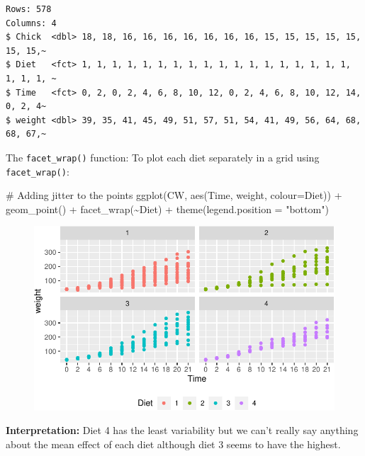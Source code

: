 \documentclass[
  letterpaper,
  DIV=11,
  numbers=noendperiod]{scrreprt}
\newenvironment{Shaded}{\begin{snugshade}}{\end{snugshade}}
\newcommand{\AttributeTok}[1]{\textcolor[rgb]{0.40,0.45,0.13}{#1}}
\newcommand{\CommentTok}[1]{\textcolor[rgb]{0.37,0.37,0.37}{#1}}
\newcommand{\FunctionTok}[1]{\textcolor[rgb]{0.28,0.35,0.67}{#1}}
\newcommand{\NormalTok}[1]{\textcolor[rgb]{0.00,0.23,0.31}{#1}}
\newcommand{\SpecialCharTok}[1]{\textcolor[rgb]{0.37,0.37,0.37}{#1}}
\newcommand{\StringTok}[1]{\textcolor[rgb]{0.13,0.47,0.30}{#1}}
\theoremstyle{definition}
\theoremstyle{plain}
\theoremstyle{plain}
\theoremstyle{remark}
\begin{document}
\begin{verbatim}
Rows: 578
Columns: 4
$ Chick  <dbl> 18, 18, 16, 16, 16, 16, 16, 16, 16, 15, 15, 15, 15, 15, 15, 15,~
$ Diet   <fct> 1, 1, 1, 1, 1, 1, 1, 1, 1, 1, 1, 1, 1, 1, 1, 1, 1, 1, 1, 1, 1, ~
$ Time   <fct> 0, 2, 0, 2, 4, 6, 8, 10, 12, 0, 2, 4, 6, 8, 10, 12, 14, 0, 2, 4~
$ weight <dbl> 39, 35, 41, 45, 49, 51, 57, 51, 54, 41, 49, 56, 64, 68, 68, 67,~
\end{verbatim}

The \texttt{facet\_wrap()} function: To plot each diet separately in a
grid using \texttt{facet\_wrap()}:

\begin{Shaded}
\begin{Highlighting}[]
\CommentTok{\# Adding jitter to the points}
\FunctionTok{ggplot}\NormalTok{(CW, }\FunctionTok{aes}\NormalTok{(Time, weight, }\AttributeTok{colour=}\NormalTok{Diet)) }\SpecialCharTok{+}
  \FunctionTok{geom\_point}\NormalTok{() }\SpecialCharTok{+}
  \FunctionTok{facet\_wrap}\NormalTok{(}\SpecialCharTok{\textasciitilde{}}\NormalTok{Diet) }\SpecialCharTok{+}
  \FunctionTok{theme}\NormalTok{(}\AttributeTok{legend.position =} \StringTok{"bottom"}\NormalTok{)}
\end{Highlighting}
\end{Shaded}

\begin{figure}[H]

{\centering \includegraphics{./01-Introduction-to-R_files/figure-pdf/ScatterPlot-1.pdf}

}

\end{figure}

\textbf{Interpretation:} Diet 4 has the least variability but we can't
really say anything about the mean effect of each diet although diet 3
seems to have the highest.
\end{document}

